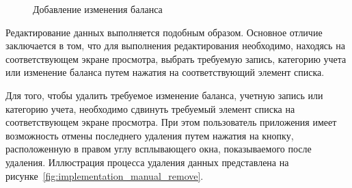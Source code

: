 \begin{figure}[h!]
  \centering
  \caption{Добавление изменения баланса}
  \label{fig:implementation_manual_balance_change}
\end{figure}

Редактирование данных выполняется подобным образом.
Основное отличие заключается в том, что для выполнения редактирования необходимо,
находясь на соответствующем экране просмотра,
выбрать требуемую запись, категорию учета или изменение баланса
путем нажатия на соответствующий элемент списка.

Для того, чтобы удалить требуемое изменение баланса,
учетную запись или категорию учета, необходимо
сдвинуть требуемый элемент списка на соответствующем экране просмотра.
При этом пользователь приложения имеет возможность отмены последнего
удаления путем нажатия на кнопку, расположенную в правом углу всплывающего
окна, показываемого после удаления.
Иллюстрация процесса удаления данных представлена на
рисунке~\ref{fig:implementation_manual_remove}.

